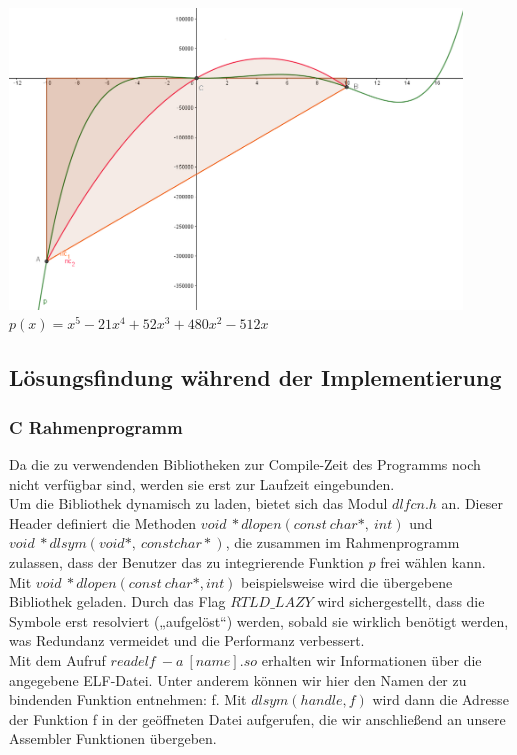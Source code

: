\documentclass[course=erap]{aspdoc}
\begin{document}
\\
\\\begin{minipage}[t]{0.5\textwidth}
\includegraphics[width=0.9\textwidth]{x^5-21x^4+52x^3+480x^2-512x_-10_10}\\
$p(x) = x^5-21x^4+52x^3+480x^2-512x$\\
\end{minipage}

\subsection{Lösungsfindung während der Implementierung}
\subsubsection{C Rahmenprogramm}
Da die zu verwendenden Bibliotheken zur Compile-Zeit des Programms noch nicht verfügbar sind, werden sie erst zur Laufzeit eingebunden. \\
Um die Bibliothek dynamisch zu laden, bietet sich das Modul $dlfcn.h$ an. Dieser Header definiert die Methoden $void\ *dlopen(const\ char *,\ int)$ und  $void\ *dlsym(void *,\ const char *)$, die zusammen im Rahmenprogramm zulassen, dass der Benutzer das zu integrierende Funktion $p$ frei wählen kann.\\
Mit $void\ *dlopen(const\ char *, int)$ beispielsweise wird die übergebene Bibliothek geladen. Durch das Flag $RTLD\_LAZY$ wird sichergestellt, dass die Symbole erst resolviert („aufgelöst“) werden, sobald sie wirklich benötigt werden, was Redundanz vermeidet und die Performanz verbessert.\\
Mit dem Aufruf $readelf\ -a\ [name].so$ erhalten wir Informationen über die angegebene ELF-Datei. Unter anderem können wir hier den Namen der zu bindenden Funktion entnehmen: f.
Mit $dlsym(handle,f)$ wird dann die Adresse der Funktion f in der geöffneten Datei aufgerufen, die wir anschließend an unsere Assembler Funktionen übergeben.\\
 
\end{document}
